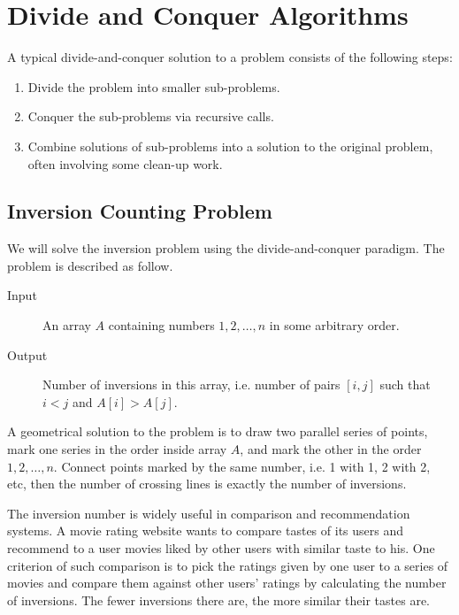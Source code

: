 \ifx\PREAMBLE\undefined


\fi
\chapter{Divide and Conquer Algorithms}
A typical divide-and-conquer solution to a problem consists of the following steps:
\begin{enumerate}
\item Divide the problem into smaller sub-problems.
\item Conquer the sub-problems via recursive calls.
\item Combine solutions of sub-problems into a solution to the original problem, often involving some clean-up work.
\end{enumerate}
\section{Inversion Counting Problem}
We will solve the inversion problem using the divide-and-conquer paradigm. The problem is described as follow.
\begin{description}
\item[Input]An array $A$ containing numbers $1,2,\dots,n$ in some arbitrary order.
\item[Output]Number of inversions in this array, i.e. number of pairs $[i,j]$ such that $i<j$ and $A[i]>A[j]$.
\end{description}
A geometrical solution to the problem is to draw two parallel series of points, mark one series in the order inside array $A$, and mark the other in the order $1,2,\dots,n$. Connect points marked by the same number, i.e. 1 with 1, 2 with 2, etc, then the number of crossing lines is exactly the number of inversions. 

The inversion number is widely useful in comparison and recommendation systems. A movie rating website wants to compare tastes of its users and recommend to a user movies liked by other users with similar taste to his. One criterion of such comparison is to pick the ratings given by one user to a series of movies and compare them against other users' ratings by calculating the number of inversions. The fewer inversions there are, the more similar their tastes are.

